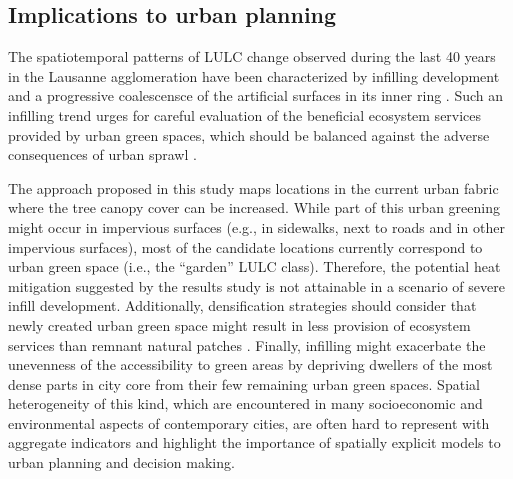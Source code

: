 \documentclass[10pt,letterpaper]{article}
\begin{document}



\subsection*{Implications to urban planning}

The spatiotemporal patterns of LULC change observed during the last 40 years in the Lausanne agglomeration have been characterized by infilling development and a progressive coalescensce of the artificial surfaces in its inner ring \cite{bosch2020spatiotemporal}.
Such an infilling trend urges for careful evaluation of the beneficial ecosystem services provided by urban green spaces, which should be balanced against the adverse consequences of urban sprawl \cite{haaland2015challenges,artmann2019urban}.

The approach proposed in this study maps locations in the current urban fabric where the tree canopy cover can be increased.
While part of this urban greening might occur in impervious surfaces (e.g., in sidewalks, next to roads and in other impervious surfaces), most of the candidate locations currently correspond to urban green space (i.e., the ``garden'' LULC class).
Therefore, the potential heat mitigation suggested by the results study is not attainable in a scenario of severe infill development.
Additionally, densification strategies should consider that newly created urban green space might result in less provision of ecosystem services than remnant natural patches \cite{jim2013sustainable,sun2017effects,wang2019quantity}.
Finally, infilling might exacerbate the unevenness of the accessibility to green areas by depriving dwellers of the most dense parts in city core from their few remaining urban green spaces.  %
Spatial heterogeneity of this kind, which are encountered in many socioeconomic and environmental aspects of contemporary cities, are often hard to represent with aggregate indicators and highlight the importance of spatially explicit models to urban planning and decision making.
\end{document}
